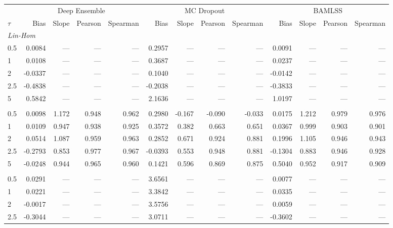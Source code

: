 \begin{tabular}{lrrrrrrrrrrrr}
\toprule
 & \multicolumn{4}{c}{Deep Ensemble} & \multicolumn{4}{c}{MC Dropout} & \multicolumn{4}{c}{BAMLSS} \\
\cmidrule(lr){2-5} \cmidrule(lr){6-9} \cmidrule(lr){10-13}
$\tau$ & Bias & Slope & Pearson & Spearman & Bias & Slope & Pearson & Spearman & Bias & Slope & Pearson & Spearman \\
\midrule
\multicolumn{13}{l}{\textit{Lin-Hom}} \\
0.5 & 0.0084 & --- & --- & --- & 0.2957 & --- & --- & --- & 0.0091 & --- & --- & --- \\
1 & 0.0108 & --- & --- & --- & 0.3687 & --- & --- & --- & 0.0237 & --- & --- & --- \\
2 & -0.0337 & --- & --- & --- & 0.1040 & --- & --- & --- & -0.0142 & --- & --- & --- \\
2.5 & -0.4838 & --- & --- & --- & -0.2038 & --- & --- & --- & -0.3833 & --- & --- & --- \\
5 & 0.5842 & --- & --- & --- & 2.1636 & --- & --- & --- & 1.0197 & --- & --- & --- \\
\addlinespace
\multicolumn{13}{l}{\textit{Lin-Het}} \\
0.5 & 0.0098 & 1.172 & 0.948 & 0.962 & 0.2980 & -0.167 & -0.090 & -0.033 & 0.0175 & 1.212 & 0.979 & 0.976 \\
1 & 0.0109 & 0.947 & 0.938 & 0.925 & 0.3572 & 0.382 & 0.663 & 0.651 & 0.0367 & 0.999 & 0.903 & 0.901 \\
2 & 0.0514 & 1.087 & 0.959 & 0.963 & 0.2852 & 0.671 & 0.924 & 0.881 & 0.1996 & 1.105 & 0.946 & 0.943 \\
2.5 & -0.2793 & 0.853 & 0.977 & 0.967 & -0.0393 & 0.553 & 0.948 & 0.881 & -0.1304 & 0.883 & 0.946 & 0.928 \\
5 & -0.0248 & 0.944 & 0.965 & 0.960 & 0.1421 & 0.596 & 0.869 & 0.875 & 0.5040 & 0.952 & 0.917 & 0.909 \\
\addlinespace
\multicolumn{13}{l}{\textit{Sin-Hom}} \\
0.5 & 0.0291 & --- & --- & --- & 3.6561 & --- & --- & --- & 0.0077 & --- & --- & --- \\
1 & 0.0221 & --- & --- & --- & 3.3842 & --- & --- & --- & 0.0335 & --- & --- & --- \\
2 & -0.0017 & --- & --- & --- & 3.5756 & --- & --- & --- & 0.0059 & --- & --- & --- \\
2.5 & -0.3044 & --- & --- & --- & 3.0711 & --- & --- & --- & -0.3602 & --- & --- & --- \\

\end{tabular}
